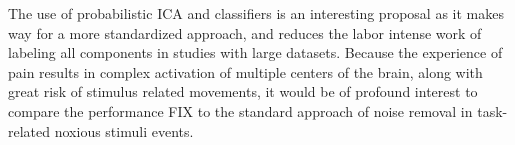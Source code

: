 The use of probabilistic ICA and classifiers is an interesting proposal as it makes way for a more standardized approach, and reduces the labor intense work of labeling all components in studies with large datasets. Because the experience of pain results in complex activation of multiple centers of the brain, along with great risk of stimulus related movements, it would be of profound interest to compare the performance FIX to the standard approach of noise removal in task-related noxious stimuli events.     
